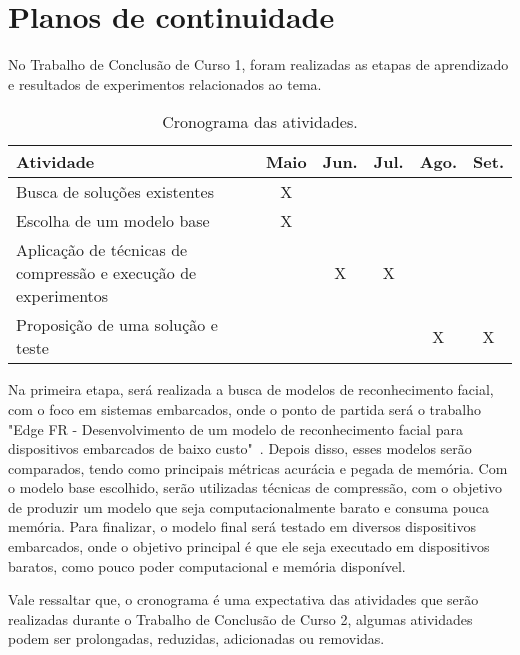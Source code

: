 \chapter{Planos de continuidade}
No Trabalho de Conclusão de Curso 1, foram realizadas as etapas de aprendizado e resultados de experimentos
relacionados ao tema.

\begin{center}
\begin{table}[htb]
\centering
\ABNTEXfontereduzida
\caption[Cronograma das atividades]{Cronograma das atividades.}
\label{tabela_plano}
\begin{tabular}{ |l|c|c|c|c|c| }
	\hline
	Atividade & Maio & Jun. & Jul. & Ago. & Set. \\
	\hline
	Busca de soluções existentes & X & & & & \\
	\hline
	Escolha de um modelo base & X & &  & & \\
	\hline
	Aplicação de técnicas de compressão e execução de experimentos & & X & X & & \\
	\hline
	Proposição de uma solução e teste & & & & X & X \\
	\hline
\end{tabular}
\end{table}
\end{center}

Na primeira etapa, será realizada a busca de modelos de reconhecimento facial, com o foco em sistemas embarcados,
onde o ponto de partida será o trabalho "Edge FR - Desenvolvimento de um modelo de reconhecimento facial para dispositivos
embarcados de baixo custo"\  \cite{leandro}.
Depois disso, esses modelos serão comparados, tendo como principais métricas acurácia e pegada de memória.
Com o modelo base escolhido, serão utilizadas técnicas de compressão, com o objetivo de produzir um modelo que seja
computacionalmente barato e consuma pouca memória.
Para finalizar, o modelo final será testado em diversos dispositivos embarcados, onde o objetivo principal é que ele
seja executado em dispositivos baratos, como pouco poder computacional e memória disponível.

Vale ressaltar que, o cronograma é uma expectativa das atividades que serão realizadas durante o Trabalho de Conclusão
de Curso 2, algumas atividades podem ser prolongadas, reduzidas, adicionadas ou removidas.
